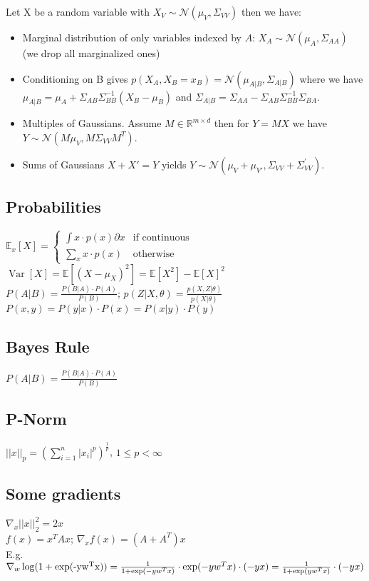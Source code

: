 \documentclass[11pt]{article}
\newcommand{\gauss}{\mathcal{N}}
\begin{document}
\begin{multicols*}{3}
Let X be a random variable with $X_V \sim \gauss(\mu_V,\Sigma_{VV})$ then we have:
\begin{itemize}
	\item Marginal distribution of only variables indexed by $A$: $X_A \sim \gauss(\mu_A,\Sigma_{AA})$ (we drop all marginalized ones)
	\item Conditioning on B gives $p(X_A,X_B = x_B) = \gauss(\mu_{A|B},\Sigma_{A|B})$ where we have $\mu_{A|B} = \mu_A + \Sigma_{AB}\Sigma_{BB}^{-1}(X_B - \mu_B)$ and $\Sigma_{A|B} = \Sigma_{AA} - \Sigma_{AB}\Sigma_{BB}^{-1}\Sigma_{BA}$.
	\item Multiples of Gaussians. Assume $M\in \mathbb{R}^{m\times d}$ then for $Y=MX$ we have $Y\sim \gauss (M\mu_V,M\Sigma_{VV}M^T)$.
	\item Sums of Gaussians $X+X'=Y$ yields $Y\sim \gauss (\mu_V + \mu_{V'} ,\Sigma_{VV} + \Sigma^{'}_{VV})$.
\end{itemize}


\subsection*{Probabilities}
$\mathbb{E}_x[X] = \begin{cases}
	\int x \cdot p(x) \partial x  & \text{if continuous}\\
	\sum_x x \cdot p(x) & \text{otherwise}
\end{cases}$\\
$\operatorname{Var}[X] = \mathbb{E}[(X-\mu_X)^2] = \mathbb{E}[X^2] - \mathbb{E}[X]^2$\\
$P(A|B) = \frac{P(B|A) \cdot P(A)}{P(B)}$; $p(Z|X,\theta) = \frac{p(X,Z|\theta)}{p(X|\theta)}$\\
$P(x,y) = P(y|x) \cdot  P(x) = P(x|y) \cdot P(y)$

\subsection*{{Bayes Rule}}
$P(A|B) = \frac{P(B|A) \cdot P(A)}{P(B)}$

\subsection*{P-Norm}
$||x||_p = (\sum_{i=1}^n|x_i|^p)^{\frac{1}{p}}$, $1 \leq p < \infty$

\subsection*{Some gradients}
$\nabla_x ||x||_2^2 = 2 x$\\
$f(x) = x^T A x$; $\nabla_x f(x) = (A + A^T) x$\\
E.g. $\nabla_w \operatorname{log}(1+\operatorname{exp(-y w^T x)}) = \\
\frac{1}{1+\operatorname{exp}(-y w^T x)} \cdot \operatorname{exp}(-y w^T x) \cdot (-y x) = \\
\frac{1}{1 + \operatorname{exp}(y w^T x)} \cdot(-yx)$\\



\end{multicols*}
\end{document}
